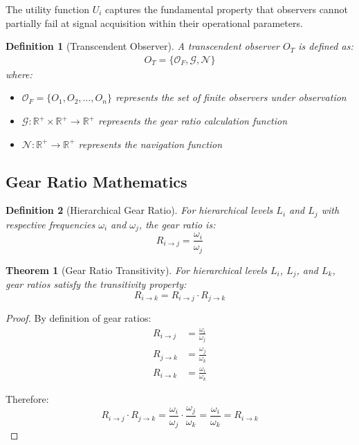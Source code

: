 \documentclass[12pt,a4paper]{article}
\newtheorem{theorem}{Theorem}
\newtheorem{definition}{Definition}
\begin{document}
The utility function $U_i$ captures the fundamental property that observers cannot partially fail at signal acquisition within their operational parameters.

\begin{definition}[Transcendent Observer]
A transcendent observer $O_T$ is defined as:
\begin{align}
O_T = \{\mathcal{O}_F, \mathcal{G}, \mathcal{N}\}
\end{align}
where:
\begin{itemize}
\item $\mathcal{O}_F = \{O_1, O_2, \ldots, O_n\}$ represents the set of finite observers under observation
\item $\mathcal{G}: \mathbb{R}^+ \times \mathbb{R}^+ \to \mathbb{R}^+$ represents the gear ratio calculation function
\item $\mathcal{N}: \mathbb{R}^+ \to \mathbb{R}^+$ represents the navigation function
\end{itemize}
\end{definition}

\subsection{Gear Ratio Mathematics}

\begin{definition}[Hierarchical Gear Ratio]
For hierarchical levels $L_i$ and $L_j$ with respective frequencies $\omega_i$ and $\omega_j$, the gear ratio is:
\begin{equation}
R_{i \to j} = \frac{\omega_i}{\omega_j}
\label{eq:gear_ratio}
\end{equation}
\end{definition}

\begin{theorem}[Gear Ratio Transitivity]
For hierarchical levels $L_i$, $L_j$, and $L_k$, gear ratios satisfy the transitivity property:
\begin{equation}
R_{i \to k} = R_{i \to j} \cdot R_{j \to k}
\label{eq:gear_transitivity}
\end{equation}
\end{theorem}

\begin{proof}
By definition of gear ratios:
\begin{align}
R_{i \to j} &= \frac{\omega_i}{\omega_j} \\
R_{j \to k} &= \frac{\omega_j}{\omega_k} \\
R_{i \to k} &= \frac{\omega_i}{\omega_k}
\end{align}

Therefore:
\begin{equation}
R_{i \to j} \cdot R_{j \to k} = \frac{\omega_i}{\omega_j} \cdot \frac{\omega_j}{\omega_k} = \frac{\omega_i}{\omega_k} = R_{i \to k}
\end{equation}
\end{proof}
\end{document}
